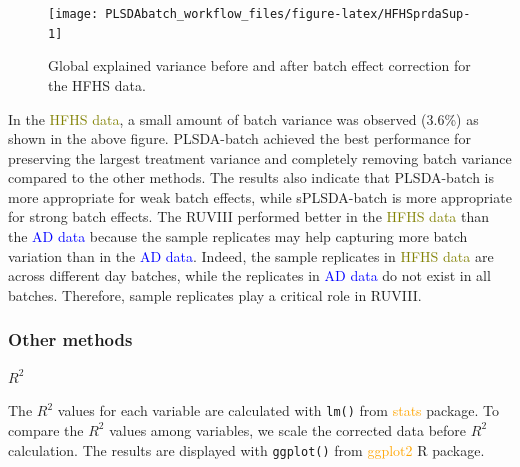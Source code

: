 \documentclass[
]{book}
\begin{document}
\begin{figure}

{\centering \texttt{[image: PLSDAbatch\_workflow\_files/figure-latex/HFHSprdaSup-1]} 

}

\caption{Global explained variance before and after batch effect correction for the HFHS data.}\label{fig:HFHSprdaSup}
\end{figure}

In the \textcolor{olive}{HFHS data}, a small amount of batch variance was observed (3.6\%) as shown in the above figure. PLSDA-batch achieved the best performance for preserving the largest treatment variance and completely removing batch variance compared to the other methods. The results also indicate that PLSDA-batch is more appropriate for weak batch effects, while sPLSDA-batch is more appropriate for strong batch effects. The RUVIII performed better in the \textcolor{olive}{HFHS data} than the \textcolor{blue}{AD data} because the sample replicates may help capturing more batch variation than in the \textcolor{blue}{AD data}. Indeed, the sample replicates in \textcolor{olive}{HFHS data} are across different day batches, while the replicates in \textcolor{blue}{AD data} do not exist in all batches. Therefore, sample replicates play a critical role in RUVIII.

\hypertarget{other-methods-2}{%
\subsubsection{Other methods}\label{other-methods-2}}

\textbf{\(R^2\)}

The \(R^2\) values for each variable are calculated with \texttt{lm()} from \textcolor{orange}{stats} package. To compare the \(R^2\) values among variables, we scale the corrected data before \(R^2\) calculation. The results are displayed with \texttt{ggplot()} from \textcolor{orange}{ggplot2} R package.
\end{document}
